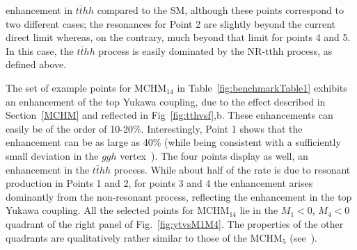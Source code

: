 enhancement in $t\bar{t}hh$ compared to the SM, although these points correspond to two different cases; the resonances for Point 2 are slightly beyond the current direct limit whereas, on the contrary, much beyond that limit for points 4 and 5. In this case, the
$t\bar{t}hh$ process is easily dominated by the NR-tthh process, as
defined above.  

The set of example points for MCHM$_{14}$ in Table~\ref{fig:benchmarkTable1} exhibits an enhancement of the top Yukawa
coupling, due to the effect described in Section~\ref{MCHM} and reflected in Fig~\ref{fig:tthvsf},b.  These
enhancements can easily be of the order of 10-20\%.  Interestingly,
Point 1 shows that the enhancement can be as large as 40\% (while
being consistent with a sufficiently small deviation in the $ggh$
vertex~\cite{MCHMtthh}). The four points display as well, an enhancement
in the $t\bar{t}hh$ process.  While about half of the rate is due to
resonant production in Points 1 and 2, for points 3 and 4 the
enhancement arises dominantly from the non-resonant process,
reflecting the enhancement in the top Yukawa coupling. All the selected points for MCHM$_{14}$ lie in the
$M_1 < 0$, $M_4 < 0$ quadrant of the right panel of
Fig.~\ref{fig:ytvsM1M4}. The properties of the other quadrants are
qualitatively rather similar to those of the MCHM$_5$ (see~\cite{MCHMtthh}).

